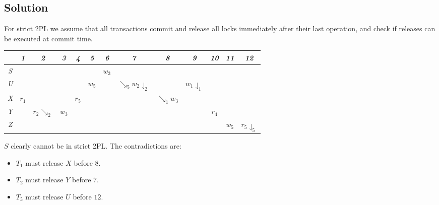 \documentclass[12pt, a4paper]{report}
\begin{document}
    \subsection*{Solution}
        For strict 2PL we assume that all transactions commit and release all locks immediately after their last operation, and check if releases can be executed at commit time.
        \begin{table}[H]
            \centering
            \begin{tabular}{c|cccccccccccc}
                    & \textit{1} & \textit{2}      & \textit{3} & \textit{4} & \textit{5} & \textit{6} & \textit{7}                        & \textit{8}      & \textit{9}              & \textit{10} & \textit{11} & \textit{12}             \\ \hline
            \textit{S} &            &                 &            &            &            & $w_3$      &                                   &                 &                         &             &             &                         \\
            \textit{U} &            &                 &            &            & $w_5$      &            & $\searrow_5w_2\downharpoonleft_2$ &                 & $w_1\downharpoonleft_1$ &             &             &                         \\
            \textit{X} & $r_1$      &                 &            & $r_5$      &            &            &                                   & $\searrow_1w_3$ &                         &             &             &                         \\
            \textit{Y} &            & $r_2\searrow_2$ & $w_3$      &            &            &            &                                   &                 &                         & $r_4$       &             &                         \\
            \textit{Z} &            &                 &            &            &            &            &                                   &                 &                         &             & $w_5$       & $r_5\downharpoonleft_5$
            \end{tabular}
        \end{table}
        $S$ clearly cannot be in strict 2PL. The contradictions are:
        \begin{itemize}
            \item $T_1$ must release $X$ before $8$. 
            \item $T_2$ must release $Y$ before $7$.
            \item $T_5$ must release $U$ before $12$.
        \end{itemize}
\end{document}

